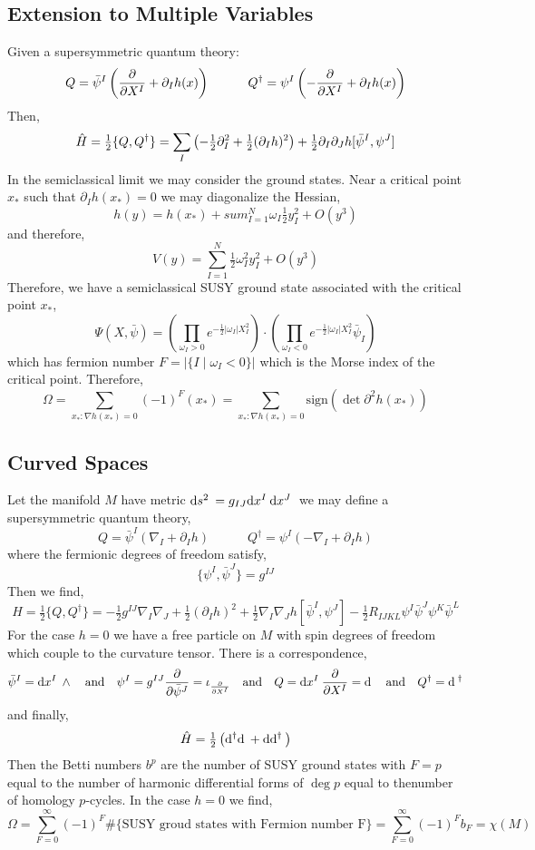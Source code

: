 \documentclass[12pt]{extarticle}
\begin{document}
\subsection{Extension to Multiple Variables}

Given a supersymmetric quantum theory:
\[ Q = \bar{\psi}^I \left( \frac{\partial{}}{\partial{X^I}} + \partial_I h(x) \right) \quad \quad \quad Q^\dagger = \psi^I \left( - \frac{\partial{}}{\partial{X^I}} + \partial_I h(x) \right) \]
Then,
\[ \hat{H} = \tfrac{1}{2} \{ Q, Q^\dagger \} = \sum_{I} \left( - \tfrac{1}{2} \partial_I^2 + \tfrac{1}{2} (\partial_I h)^2 \right) + \tfrac{1}{2} \partial_I \partial_J h [\bar{\psi}^I, \psi^J] \]
In the semiclassical limit we may consider the ground states. Near a critical point $x_*$ such that $\partial_I h(x_*) = 0$ we may diagonalize the Hessian,
\[ h(y) = h(x_*) + sum_{I = 1}^N \omega_I \tfrac{1}{2} y_I^2 + O(y^3) \]
and therefore,
\[ V(y) = \sum_{I = 1}^N \tfrac{1}{2} \omega_I^2 y_I^2 + O(y^3) \]
Therefore, we have a semiclassical SUSY ground state associated with the critical point $x_*$,
\[ \Psi(X, \bar{\psi}) = \left( \prod_{\omega_I > 0} e^{- \tfrac{1}{2} |\omega_I| X_I^2} \right) \cdot \left( \prod_{\omega_I < 0} e^{- \tfrac{1}{2} |\omega_I| X_I^2} \bar{\psi}_I \right) \]
which has fermion number $F = | \{ I \mid \omega_I < 0 \} |$ which is the Morse index of the critical point. Therefore, 
\[ \Omega = \sum_{x_* : \nabla h(x_*) = 0} (-1)^F(x_*) = \sum_{x_* : \nabla h(x_*) = 0} \mathrm{sign}(\det{\partial^2 h(x_*)}) \]

\subsection{Curved Spaces}

\newcommand{\cod}[1]{\mathrm{d}^\dagger{#1}}

Let the manifold $M$ have metric $\mathrm{d}s^2 \: = g_{IJ} \mathrm{d}x^I \: \mathrm{d}x^J \:$ we may define a supersymmetric quantum theory,
\[ Q = \bar{\psi}^I \left( \nabla_I  + \partial_I h \right) \quad \quad \quad Q^\dagger = \psi^I \left( - \nabla_I + \partial_I h \right) \]
where the fermionic degrees of freedom satisfy,
\[ \{ \psi^I, \bar{\psi}^J \} = g^{IJ} \] 
Then we find,
\[ H = \tfrac{1}{2} \{ Q, Q^\dagger \} = - \tfrac{1}{2} g^{IJ} \nabla_I \nabla_J + \tfrac{1}{2} (\partial_I h)^2 + \tfrac{1}{2} \nabla_I \nabla_J h [\bar{\psi}^I, \psi^J] - \tfrac{1}{2} R_{IJKL} \psi^I \bar{\psi}^J \psi^K \bar{\psi}^L \]
For the case $h = 0$ we have a free particle on $M$ with spin degrees of freedom which couple to the curvature tensor. There is a correspondence,
\[ \bar{\psi}^I = \mathrm{d}x^I \: \wedge \quad \text{and} \quad \psi^I = g^{IJ} \frac{\partial{}}{\partial{\bar{\psi}^J}} = \iota_{\frac{\partial{}}{\partial{X^I}}} \quad \text{and} \quad Q = \mathrm{d}x^I \: \frac{\partial{}}{\partial{X^I}} = \mathrm{d} \: \quad \text{and} \quad Q^\dagger = \mathrm{d} \:^\dagger \]
and finally,
\[ \hamilt = \tfrac{1}{2} \left( \cod{\d{}} + \d{\cod{}} \right) \]
Then the Betti numbers $b^p$ are the number of SUSY ground states with $F = p$ equal to the number of harmonic differential forms of $\deg{p}$ equal to thenumber of homology $p$-cycles. In the case $h = 0$ we find,
\[ \Omega = \sum_{F = 0}^\infty (-1)^F \#\{ \text{SUSY groud states with Fermion number F} \} = \sum_{F = 0}^\infty (-1)^F b_F = \chi(M) \]
\end{document}
